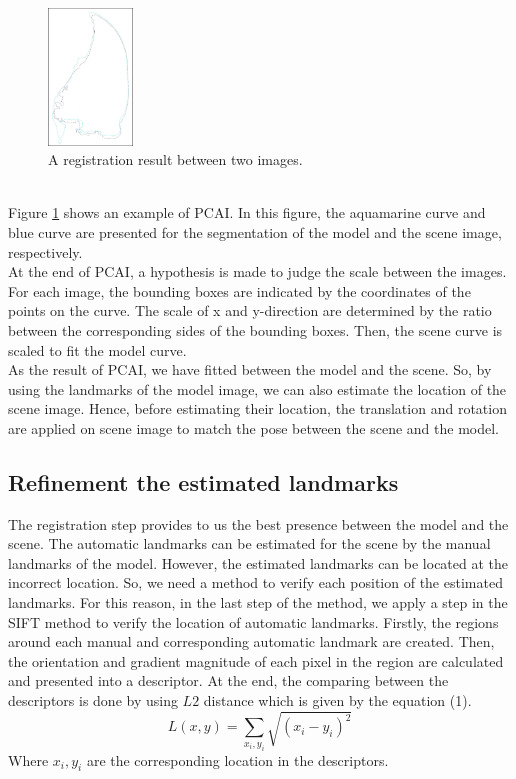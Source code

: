\documentclass[twoside,twocolumn,10pt]{article}
\begin{document}
\begin{figure}[htb]
    \centering
    \includegraphics[width=0.2\textwidth]{./images/imreg}
    \caption{A registration result between two images.}
    \label{fig:box}
\end{figure}~\\

Figure \ref{fig:box} shows an example of PCAI. In this figure, the aquamarine curve and blue curve are presented for the segmentation of the model and the scene image, respectively.\\

At the end of PCAI, a hypothesis is made to judge the scale between the images. For each image, the bounding boxes are indicated by the coordinates of the points on the curve. The scale of x and y-direction are determined by the ratio between the corresponding sides of the bounding boxes. Then, the scene curve is scaled to fit the model curve.\\

As the result of PCAI, we have fitted between the model and the scene. So, by using the landmarks of the model image, we can also estimate the location of the scene image. Hence, before estimating their location, the translation and rotation are applied on scene image to match the pose between the scene and the model. 

\subsection{Refinement the estimated landmarks}
The registration step provides to us the best presence between the model and the scene. The automatic landmarks can be estimated for the scene by the manual landmarks of the model. However, the estimated landmarks can be located at the incorrect location. So, we need a method to verify each position of the estimated landmarks. For this reason, in the last step of the method, we apply a step in the SIFT\cite{lowe2004distinctive} method to verify the location of automatic landmarks. Firstly, the regions around each manual and corresponding automatic landmark are created. Then, the orientation and gradient magnitude of each pixel in the region are calculated and presented into a descriptor. At the end, the comparing between the descriptors is done by using $L2$ distance which is given by the equation (1).
\begin{equation}
\label{eq:cross-correlation}
	L(x,y) = \sum\limits_{x_i,y_i}\sqrt{(x_i-y_i)^2}
\end{equation}
Where $x_i, y_i $ are the corresponding location in the descriptors.\\
\end{document}
